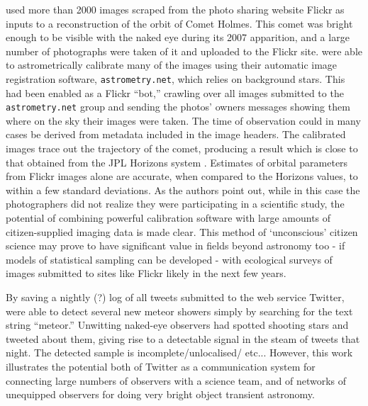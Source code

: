 \documentclass{ar2e}
\begin{document}
\citet{Lang++2011} used more than 2000 images scraped from the photo sharing website Flickr
as inputs to a reconstruction of the orbit of Comet Holmes. This comet was
bright enough to be visible with the naked eye during its 2007 apparition, and a large number
of photographs were taken of it and uploaded to the Flickr site.
\citeauthor{Lang++2011} were able to astrometrically calibrate many of the images using their automatic
image registration software, \texttt{astrometry.net}, which relies on background stars. This had been enabled as
a Flickr ``bot,'' crawling over all images submitted to the
\texttt{astrometry.net} group and sending the photos' owners messages showing
them where on the sky their images were taken.  The time of observation could in many cases be derived from metadata included in the image headers. The calibrated images trace out
the trajectory of the comet, producing a result which is close to that obtained from the JPL Horizons system \citep{Giorgini}. Estimates of orbital parameters from Flickr images alone are accurate, when compared to the Horizons values, to within a few standard deviations. As the authors point out, while in this case the
photographers did not realize they were participating in a scientific study,
the potential of combining powerful calibration software with large amounts of
citizen-supplied imaging data is made clear. This method of `unconscious' citizen science may prove to have significant value in fields beyond astronomy too - if models of statistical sampling can be developed - with ecological surveys of images submitted to sites like Flickr likely in the next few years. 

By saving a nightly (?) log of all tweets submitted to the web service
Twitter, \citet{Barentsen++2010} were able to 
detect several new meteor showers simply by searching for the text string
``meteor.'' Unwitting naked-eye observers had spotted shooting stars and
tweeted about them, giving rise to a detectable signal in the steam of tweets
that night. The detected sample is incomplete/unlocalised/ etc... However,
this work illustrates the potential both of Twitter as a communication system
for connecting large numbers of observers with a science team, and of networks
of unequipped observers for doing very bright object transient astronomy.

\end{document}

